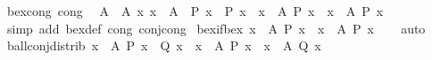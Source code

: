 \begin{isabellebody}
\endisatagproof
{\isafoldproof}%
%
\isadelimproof
\isanewline
%
\endisadelimproof
\isanewline
{}\isamarkupfalse%
\ bex{}{\isacharunderscore}{\kern0pt}cong\ {\isacharbrackleft}{\kern0pt}cong{\isacharbrackright}{\kern0pt}{\isacharcolon}{\kern0pt}\isanewline
\ \ {\isachardoublequoteopen}{\isasymlbrakk}A\ {\isacharequal}{\kern0pt}\ A{\isacharprime}{\kern0pt}{\isacharsemicolon}{\kern0pt}\ {\isasymAnd}x{\isachardot}{\kern0pt}\ x\ {\isasymin}\ A{\isacharprime}{\kern0pt}\ {\isasymLongrightarrow}\ P\ x\ {\isasymlongleftrightarrow}\ P{\isacharprime}{\kern0pt}\ x{\isasymrbrakk}\ {\isasymLongrightarrow}\ {\isacharparenleft}{\kern0pt}{\isasymexists}{\isacharbang}{\kern0pt}x\ {\isasymin}\ A{\isachardot}{\kern0pt}\ P\ x{\isacharparenright}{\kern0pt}\ {\isasymlongleftrightarrow}\ {\isacharparenleft}{\kern0pt}{\isasymexists}{\isacharbang}{\kern0pt}x\ {\isasymin}\ A{\isacharprime}{\kern0pt}{\isachardot}{\kern0pt}\ P{\isacharprime}{\kern0pt}\ x{\isacharparenright}{\kern0pt}{\isachardoublequoteclose}\isanewline
%
\isadelimproof
\ \ %
\endisadelimproof
%
\isatagproof
{}\isamarkupfalse%
\ {\isacharparenleft}{\kern0pt}simp\ add{\isacharcolon}{\kern0pt}\ bex{}{\isacharunderscore}{\kern0pt}def\ cong{\isacharcolon}{\kern0pt}\ conj{\isacharunderscore}{\kern0pt}cong{\isacharparenright}{\kern0pt}%
\endisatagproof
{\isafoldproof}%
%
\isadelimproof
\isanewline
%
\endisadelimproof
\isanewline
{}\isamarkupfalse%
\ bex{\isacharunderscore}{\kern0pt}if{\isacharunderscore}{\kern0pt}bex{}{\isacharcolon}{\kern0pt}\ {\isachardoublequoteopen}{\isasymexists}{\isacharbang}{\kern0pt}x\ {\isasymin}\ A{\isachardot}{\kern0pt}\ P\ x\ {\isasymLongrightarrow}\ {\isasymexists}x\ {\isasymin}\ A{\isachardot}{\kern0pt}\ P\ x{\isachardoublequoteclose}\isanewline
%
\isadelimproof
\ \ %
\endisadelimproof
%
\isatagproof
{}\isamarkupfalse%
\ auto%
\endisatagproof
{\isafoldproof}%
%
\isadelimproof
\isanewline
%
\endisadelimproof
\isanewline
{}\isamarkupfalse%
\ ball{\isacharunderscore}{\kern0pt}conj{\isacharunderscore}{\kern0pt}distrib{\isacharcolon}{\kern0pt}\ {\isachardoublequoteopen}{\isacharparenleft}{\kern0pt}{\isasymforall}x\ {\isasymin}\ A{\isachardot}{\kern0pt}\ P\ x\ {\isasymand}\ Q\ x{\isacharparenright}{\kern0pt}\ {\isasymlongleftrightarrow}\ {\isacharparenleft}{\kern0pt}{\isasymforall}x\ {\isasymin}\ A{\isachardot}{\kern0pt}\ P\ x{\isacharparenright}{\kern0pt}\ {\isasymand}\ {\isacharparenleft}{\kern0pt}{\isasymforall}x\ {\isasymin}\ A{\isachardot}{\kern0pt}\ Q\ x{\isacharparenright}{\kern0pt}{\isachardoublequoteclose}\isanewline

\end{isabellebody}
